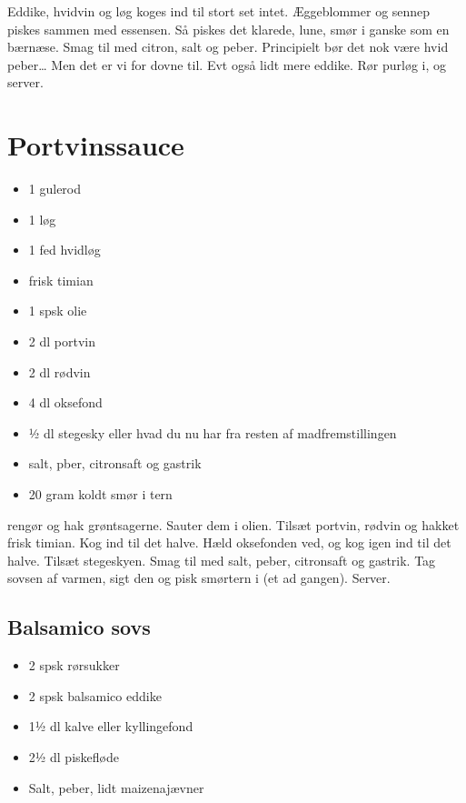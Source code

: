 \documentclass[
]{book}
\providecommand{\tightlist}{%
  \setlength{\itemsep}{0pt}\setlength{\parskip}{0pt}}
\begin{document}
Eddike, hvidvin og løg koges ind til stort set intet.
Æggeblommer og sennep piskes sammen med essensen. Så piskes det klarede,
lune, smør i ganske som en bærnæse. Smag til med citron, salt og peber.
Principielt bør det nok være hvid peber\ldots{} Men det er vi for dovne til.
Evt også lidt mere eddike.
Rør purløg i, og server.

\hypertarget{portvinssauce}{%
\section{Portvinssauce}\label{portvinssauce}}

\begin{itemize}
\tightlist
\item
  1 gulerod
\item
  1 løg
\item
  1 fed hvidløg
\item
  frisk timian
\item
  1 spsk olie
\item
  2 dl portvin
\item
  2 dl rødvin
\item
  4 dl oksefond
\item
  ½ dl stegesky eller hvad du nu har fra resten af madfremstillingen
\item
  salt, pber, citronsaft og gastrik
\item
  20 gram koldt smør i tern
\end{itemize}

rengør og hak grøntsagerne.
Sauter dem i olien.
Tilsæt portvin, rødvin og hakket frisk timian. Kog ind til det halve.
Hæld oksefonden ved, og kog igen ind til det halve. Tilsæt stegeskyen.
Smag til med salt, peber, citronsaft og gastrik.
Tag sovsen af varmen, sigt den og pisk smørtern i (et ad gangen). Server.

\hypertarget{balsamico-sovs}{%
\subsection{Balsamico sovs}\label{balsamico-sovs}}

\begin{itemize}
\tightlist
\item
  2 spsk rørsukker
\item
  2 spsk balsamico eddike
\item
  1½ dl kalve eller kyllingefond
\item
  2½ dl piskefløde
\item
  Salt, peber, lidt maizenajævner
\end{itemize}
\end{document}
